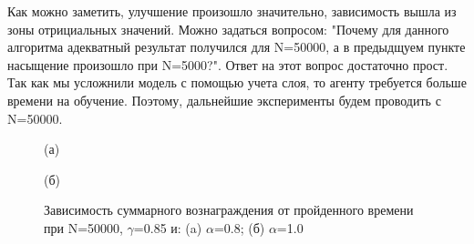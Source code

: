 \documentclass[a4paper]{report}
\theoremstyle{definition}
\theoremstyle{plain}
\theoremstyle{remark}
\theoremstyle{remark}
\theoremstyle{definition}
\begin{document}
Как можно заметить, улучшение произошло значительно, зависимость вышла из зоны отрициальных значений. Можно задаться вопросом: "Почему для данного алгоритма адекватный результат получился для N=50000, а в предыдщуем пункте насыщение произошло при N=5000?". Ответ на этот вопрос достаточно прост. Так как мы усложнили модель с помощью учета слоя, то агенту требуется больше времени на обучение. Поэтому, дальнейшие эксперименты будем проводить с N=50000.
\begin{figure}[H]
    \begin{minipage}[H]{0.49\linewidth}
        (а)\\
    \end{minipage}
    \hfill
    \begin{minipage}[H]{0.49\linewidth}
        (б)\\
    \end{minipage}
      \caption{Зависимость суммарного вознаграждения от пройденного времени при N=50000, $\gamma$=0.85 и: (a) $\alpha$=0.8; (б) $\alpha$=1.0}
\end{figure}
\end{document}
